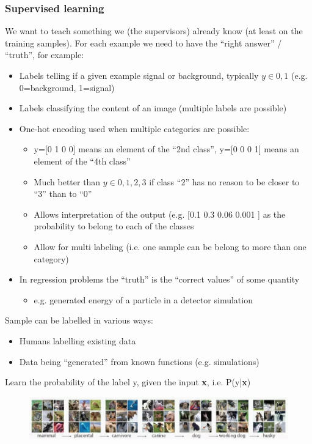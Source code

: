 \subsubsection{Supervised learning}

We want to teach something we (the supervisors) already know (at least on the training samples). For each example we need to have the “right answer” / “truth”, for example:

\begin{itemize}
	\item Labels telling if a given example signal or background, typically $y \in{0,1}$ (e.g. 0=background, 1=signal)
	\item Labels classifying the content of an image (multiple labels are possible)
	\item One-hot encoding used when multiple categories are possible:
	\begin{itemize}
		\item y=[0 1 0 0] means an element of the “2nd class”, y=[0 0 0 1] means an element of the “4th class”
		\item Much better than $y\in {0,1,2,3}$ if class “2” has no reason to be closer to “3” than to “0”
		\item Allows interpretation of the output (e.g. [0.1 0.3 0.06 0.001 ] as the probability to belong to each of the classes
		\item Allow for multi labeling (i.e. one sample can be belong to more than one category)
	\end{itemize}
	\item In regression problems the “truth” is the “correct values” of some quantity
	\begin{itemize}
		\item e.g. generated energy of a particle in a detector simulation
	\end{itemize}
\end{itemize}

Sample can be labelled in various ways:
\begin{itemize}
	\item Humans labelling existing data
	\item Data being “generated” from known functions (e.g. simulations)
\end{itemize}

Learn the probability of the label y, given the input \textbf{x}, i.e. P(y|\textbf{x})

\begin{figure}[ht]
	\centering
	\includegraphics[width=1\textwidth]{figure_ml/supervised_learning.png}
\end{figure}
\FloatBarrier

